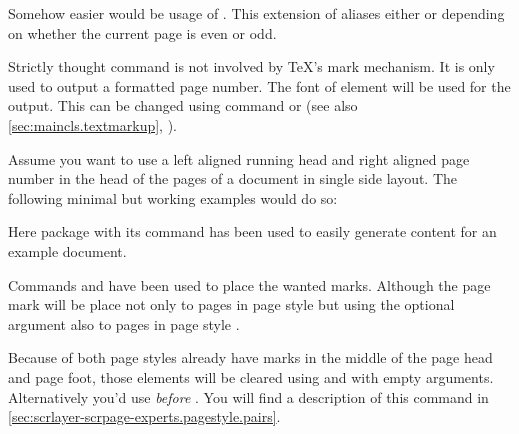 Somehow easier would be usage of . This extension of
 aliases either  or 
depending on whether the current page is even or odd.

Strictly thought command  is not involved by \TeX's mark
mechanism. It is only used to output a formatted page number.
%
The font of element
 will be used for
the output. This can be changed using command  or
 (see also \autoref{sec:maincls.textmarkup},
).%
%
\ifCommonscrlayerscrpage%
\begin{Example}
  Assume\label{example.scrlayer-scrpage.headmark} you want to use a left
  aligned running head and right aligned page
  number in the head of the pages of a document in single side layout. The
  following minimal but working examples would do so:
  Here package  with its command
   has been used to easily
  generate content for an example document.

  Commands  and  have been used to place the wanted
  marks. Although the page mark will be place not only to pages in page style
   but using the optional argument also to pages in
  page style .

  Because of both page styles already have marks in the middle of the page
  head and page foot, those elements will be cleared using  and
   with empty arguments. Alternatively you'd use
   \emph{before} . You will find a
  description of this command in
  \autoref{sec:scrlayer-scrpage-experts.pagestyle.pairs}.
\end{Example}

